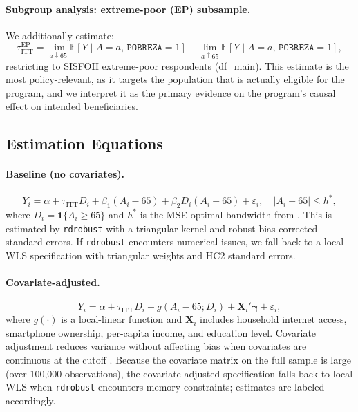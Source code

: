 \documentclass[12pt]{article}
\newcommand{\E}{\mathbb{E}}
\begin{document}
\paragraph{Subgroup analysis: extreme-poor (EP) subsample.}
We additionally estimate:
\begin{equation}
\tau_{\text{ITT}}^{\text{EP}}
= \lim_{a \downarrow 65} \E[Y \mid A=a,\,\texttt{POBREZA}=1]
- \lim_{a \uparrow 65} \E[Y \mid A=a,\,\texttt{POBREZA}=1],
\label{eq:itt_ep}
\end{equation}
restricting to SISFOH extreme-poor respondents (df\_main). This estimate
is the most policy-relevant, as it targets the population that is actually
eligible for the program, and we interpret it as the primary evidence on the
program's causal effect on intended beneficiaries.

\subsection{Estimation Equations}

\paragraph{Baseline (no covariates).}
\begin{equation}
Y_i = \alpha + \tau_{\text{ITT}} D_i
    + \beta_1 (A_i - 65)
    + \beta_2 D_i (A_i - 65)
    + \varepsilon_i,
\quad |A_i - 65| \le h^{*},
\label{eq:baseline}
\end{equation}
where $D_i = \mathbf{1}\{A_i \ge 65\}$ and $h^{*}$ is the MSE-optimal
bandwidth from \citet{calonico2014}. This is estimated by \texttt{rdrobust}
with a triangular kernel and robust bias-corrected standard errors. If
\texttt{rdrobust} encounters numerical issues, we fall back to a local WLS
specification with triangular weights and HC2 standard errors.

\paragraph{Covariate-adjusted.}
\begin{equation}
Y_i = \alpha + \tau_{\text{ITT}} D_i
    + g(A_i - 65; D_i)
    + \mathbf{X}_i' \boldsymbol{\gamma}
    + \varepsilon_i,
\label{eq:covariates}
\end{equation}
where $g(\cdot)$ is a local-linear function and $\mathbf{X}_i$ includes
household internet access, smartphone ownership, per-capita income, and
education level. Covariate adjustment reduces variance without affecting bias
when covariates are continuous at the cutoff \citep{calonico2019}. Because
the covariate matrix on the full sample is large (over 100,000 observations),
the covariate-adjusted specification falls back to local WLS when
\texttt{rdrobust} encounters memory constraints; estimates are labeled
accordingly.
\end{document}
